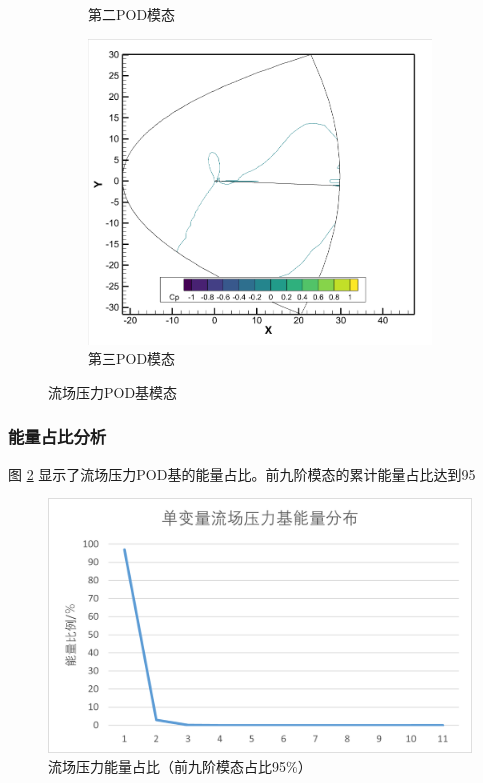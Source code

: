 \begin{figure}[H]
\begin{subfigure}[b]{0.32\textwidth}
        \caption{第二POD模态}
    \end{subfigure}
    \begin{subfigure}[b]{0.32\textwidth}
        \includegraphics[width=\textwidth]{image/基压力分布图/单变量流场压力基3.png}
        \caption{第三POD模态}
    \end{subfigure}
    \caption{\songti 流场压力POD基模态}
    \label{fig:flow_pod_modes}
\end{figure}

\subsubsection{能量占比分析}

图 \ref{fig:flow_energy} 显示了流场压力POD基的能量占比。前九阶模态的累计能量占比达到95%

\begin{figure}[H]
    \centering
    \includegraphics[width=0.8\linewidth]{image/基能量分布/单变量流场压力基能量分布.png}
    \caption{\songti 流场压力能量占比（前九阶模态占比95\%）}
    \label{fig:flow_energy}
\end{figure}

